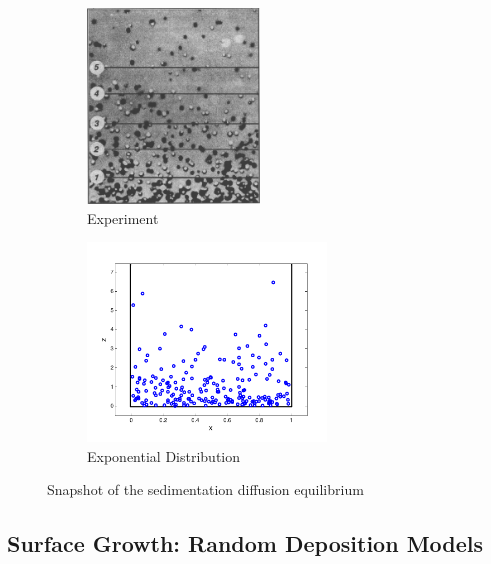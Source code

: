 \begin{figure}
	\centering
	\begin{subfigure}{0.45\textwidth}
		\centering
		\includegraphics[width=1.8in]{15.Random-Numbers/sediment.pdf}		
		\caption{Experiment}
	\end{subfigure}
	\begin{subfigure}{0.45\textwidth}
		\centering
		\includegraphics[width=2.5in]{15.Random-Numbers/sediment2.pdf}
		\caption{Exponential Distribution}
	\end{subfigure}
	\caption{Snapshot of the sedimentation diffusion equilibrium}\label{fig:sediment}
\end{figure}

\noindent
\subsection{Surface Growth: Random Deposition Models}


